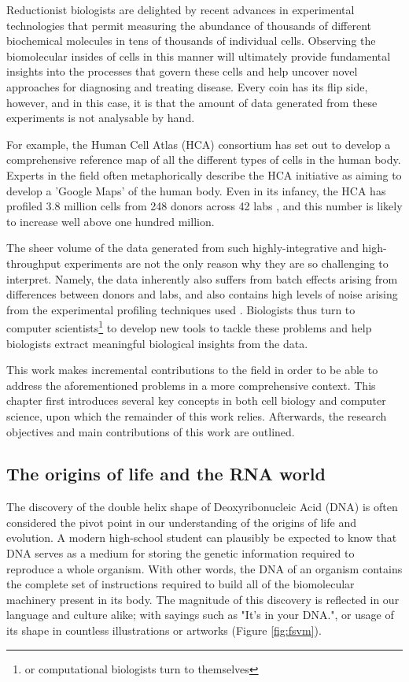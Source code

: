 Reductionist biologists are delighted by recent advances in experimental technologies that permit measuring the abundance of thousands of different biochemical molecules in tens of thousands of individual cells.  Observing the biomolecular insides of cells in this manner will ultimately provide fundamental insights into the processes that govern these cells and help uncover novel approaches for diagnosing and treating disease. Every coin has its flip side, however, and in this case, it is that the amount of data generated from these experiments is not analysable by hand.  

For example, the Human Cell Atlas (HCA) consortium \cite{regev_humancellatlas_2018} has set out to develop a comprehensive reference map of all the different types of cells in the human body. Experts in the field often metaphorically describe the HCA initiative as aiming to develop a 'Google Maps' of the human body. Even in its infancy, the HCA has profiled 3.8 million cells from 248 donors across 42 labs \cite{humancellatlasconsortium_humancellatlas_2018}, and this number is likely to increase well above one hundred million.

The sheer volume of the data generated from such highly-integrative and high-throughput experiments are not the only reason why they are so challenging to interpret. Namely, the data inherently also suffers from batch effects arising from differences between donors and labs, and also contains high levels of noise arising from the experimental profiling techniques used \cite{hon_humancellatlas_2018}. Biologists thus turn to computer scientists\footnote{or computational biologists turn to themselves} to develop new tools to tackle these problems and help biologists extract meaningful biological insights from the data.

This work makes incremental contributions to the field in order to be able to address the aforementioned problems in a more comprehensive context. This chapter first introduces several key concepts in both cell biology and computer science, upon which the remainder of this work relies. Afterwards, the research objectives and main contributions of this work are outlined.

\subsection{The origins of life and the RNA world}
The discovery of the double helix shape of Deoxyribonucleic Acid (DNA) \cite{watson_molecularstructurenucleic_1953} is often considered the pivot point in our understanding of the origins of life and evolution. A modern high-school student can plausibly be expected to know that DNA serves as a medium for storing the genetic information required to reproduce a whole organism. With other words, the DNA of an organism contains the complete set of instructions required to build all of the biomolecular machinery present in its body. The magnitude of this discovery is reflected in our language and culture alike; with sayings such as "It's in your DNA.", or usage of its shape in countless illustrations or artworks (Figure \ref{fig:fsvm}).


